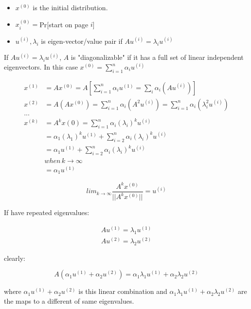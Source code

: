 \begin{itemize}
	\item $x^{(0)}$ is the initial distribution.
	
	\item $x^{(0)}_i = $Pr[start on page $i$]
	
	\item $u^{(i)}, \lambda_i$ is eigen-vector/value pair if $Au^{(i)} = \lambda_iu^{(i)}$
\end{itemize}


If $Au^{(i)} = \lambda_iu^{(i)}$, $A$ is "diagonalizable" if it has a full set of linear independent eigenvectors. In this case $x^{(0)} = \sum^n_{i=1}\alpha_iu^{(i)}$

\begin{align*}
x^{(1)} &= Ax^{(0)} = A[\sum^n_{i=1}\alpha_iu^{(1)} = \sum_i\alpha_i(Au^{(i)})]\\
x^{(2)} &= A(Ax^{(0)}) = \sum^n_{i=1}\alpha_i(A^2u^{(i)}) = \sum^n_{i=1}\alpha_i(\lambda_i^2u^{(i)})\\
...\\
x^{(k)} &= A^kx{(0)} = \sum^n_{i=1}\alpha_i(\lambda_i)^ku^{(i)}\\
&= \alpha_1(\lambda_1)^ku^{(1)} + \sum^n_{i=2}\alpha_i(\lambda_i)^ku^{(i)} \\
&= \alpha_1u^{(1)} + \sum^n_{i=2}\alpha_i(\lambda_i)^ku^{(i)}\\
&when \,k \rightarrow \infty\\
&= \alpha_1u^{(1)}
\end{align*}

\begin{equation*}
lim_{k\rightarrow \infty}\frac{A^kx^{(0)}}{||A^kx^{(0)}||} =u^{(i)}
\end{equation*}


If have repeated eigenvalues:

\begin{align*}
Au^{(1)} =\lambda_1u^{(1)}\\
Au^{(2)} =\lambda_2u^{(2)}
\end{align*}

clearly:

\begin{equation*}
A(\alpha_1u^{(1)} + \alpha_2u^{(2)}) = \alpha_1\lambda_1u^{(1)} + \alpha_2\lambda_2u^{(2)}
\end{equation*}

where $\alpha_1u^{(1)} + \alpha_2u^{(2)}$ is this linear combination and $\alpha_1\lambda_1u^{(1)} + \alpha_2\lambda_2u^{(2)}$ are the maps to a different of same eigenvalues.

